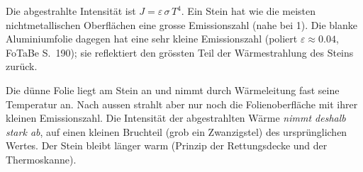 Die abgestrahlte Intensität ist $J = \varepsilon\,\sigma\,T^4$. Ein Stein hat wie die meisten nichtmetallischen Oberflächen eine grosse Emissionszahl (nahe bei 1). Die blanke Aluminiumfolie dagegen hat eine sehr kleine Emissionszahl (poliert $\varepsilon \approx 0.04$, FoTaBe S.~190); sie reflektiert den grössten Teil der Wärmestrahlung des Steins zurück.

Die dünne Folie liegt am Stein an und nimmt durch Wärmeleitung fast seine Temperatur an. Nach aussen strahlt aber nur noch die Folienoberfläche mit ihrer kleinen Emissionszahl. Die Intensität der abgestrahlten Wärme \emph{nimmt deshalb stark ab}, auf einen kleinen Bruchteil (grob ein Zwanzigstel) des ursprünglichen Wertes. Der Stein bleibt länger warm (Prinzip der Rettungsdecke und der Thermoskanne).
